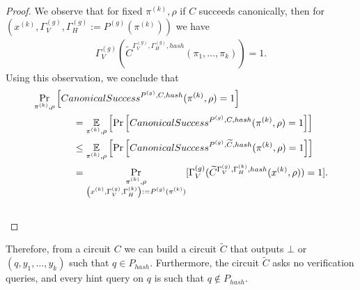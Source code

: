 \begin{proof}
We observe that for fixed $\pi^{(k)}, \rho$ if $C$ succeeds canonically, then for $(x^{(k)}, \Gamma_V^{(g)}, \Gamma_H^{(g)} := P^{(g)}(\pi^{(k)}))$ we have
\begin{align*}
\Gamma_V^{(g)} (\widetilde{C}^{\Gamma_V^{(g)}, \Gamma_H^{(g)}, hash}(\pi_1, \dots, \pi_k)) = 1.
\end{align*}
Using this observation, we conclude that
\begin{align*}
  &\underset{\pi^{(k)}, \rho}{\Pr}\left[CanonicalSuccess^{P^{(g)}, C, hash}(\pi^{(k)}, \rho) = 1\right] \\
  &\mbox\qquad\qquad = \underset{\pi^{(k)}, \rho}{\mathbb{E}}\left[\underset{}{\Pr}\left[CanonicalSuccess^{P^{(g)}, C, hash}(\pi^{(k)}, \rho) = 1\right]\right] \\
  &\mbox\qquad\qquad \leq \underset{\pi^{(k)}, \rho}{\mathbb{E}}\left[\underset{}{\Pr}\left[CanonicalSuccess^{P^{(g)}, \widetilde{C}, hash}(\pi^{(k)}, \rho) = 1\right]\right] \\
  &\mbox\qquad\qquad = \underset{\substack{\pi^{(k)}, \rho \\ \left(x^{(k)}, \Gamma_V^{(g)}, \Gamma_H^{(k)}\right) := P^{(g)}(\pi^{(k)})}}{\Pr}[\Gamma_V^{(g)} (\widetilde{C}^{\Gamma_V^{(g)}, \Gamma_H^{(k)}, hash}(x^{(k)}, \rho)) = 1].
\end{align*}
\\\text{  }
\end{proof}
%
Therefore, from a circuit $C$ we can build a circuit $\widetilde{C}$ that outputs $\bot$ or $(q, y_1, \dots, y_k)$ such that $q \in P_{hash}$.
Furthermore, the circuit $\widetilde{C}$ asks no verification queries, and every hint query on $q$ is such that $q \notin P_{hash}$.
%
%
